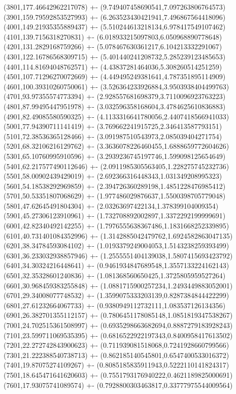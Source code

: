 {(3801,177.46642962217078) +- (9.749407458690541,7.097263806764573)
(3901,159.79592853527993) +- (6.263523430421941,7.496867564418096)
(4001,149.21935355889437) +- (5.510244613218134,6.978417549107462)
(4101,139.7156318270831) +- (6.018933215097803,6.050968890778648)
(4201,131.2829168759266) +- (5.078467630361217,6.104213332291067)
(4301,122.16786568309715) +- (5.401440241208732,5.285239123485653)
(4401,114.81694048762571) +- (4.43837281464036,5.308260514251259)
(4501,107.71296270072669) +- (4.449495249381641,4.787351895114909)
(4601,100.39310260750061) +- (3.526364233926884,3.9503938404499763)
(4701,93.97355574773394) +- (2.928557681698379,3.7110096923763223)
(4801,87.99495447951978) +- (3.032596358168604,3.4784625610836883)
(4901,82.49085580590325) +- (4.1133316641780056,2.4407418566941033)
(5001,77.94390711141419) +- (3.769662241915725,2.346413587793151)
(5101,72.38536365128466) +- (3.091987510543973,2.085039404271754)
(5201,68.32106216129762) +- (3.3636078226460455,1.6888659772604626)
(5301,65.10760995910596) +- (3.2939236745197746,1.599098125654649)
(5401,62.217577490112646) +- (2.0911985305563405,1.228275745232736)
(5501,58.00902439429019) +- (2.692366316448343,1.031349208995323)
(5601,54.18538292969859) +- (2.394726360289198,1.4851228476985412)
(5701,50.53351807068629) +- (1.977486029876637,1.5500398705779048)
(5801,47.62645491804304) +- (2.03263697422134,1.378399104009354)
(5901,45.27306123910961) +- (1.732708892002897,1.3372292199999691)
(6001,42.82340492142255) +- (1.7976555638367486,1.1831668252339895)
(6101,40.731401084352996) +- (1.3142885042479762,1.6924582863047135)
(6201,38.34784593084102) +- (1.0193379249004053,1.5143238259393499)
(6301,36.233032938857946) +- (1.2555551404139038,1.5807415693423792)
(6401,34.30324216448641) +- (0.9461934847689548,1.3557133224162143)
(6501,32.35328601240836) +- (1.081368560650425,1.3725805959527264)
(6601,30.968459383255848) +- (1.0881715900257234,1.2493449883052001)
(6701,29.34008077748532) +- (1.3599075333203139,0.8287384844422299)
(6801,27.61232664067733) +- (0.9380949112732111,1.083537126134356)
(6901,26.382701355112157) +- (0.7806451178085148,1.0851819347538267)
(7001,24.702515361508997) +- (0.6935298663682694,0.8887279183928243)
(7101,23.599711069535395) +- (0.6816522922197343,0.8400958417613502)
(7201,22.272742843900623) +- (0.711939081518068,0.7241928660799566)
(7301,21.222388540738713) +- (0.862185140545801,0.6547400533016372)
(7401,19.87075274109267) +- (0.8085185835911943,0.5222110141824317)
(7501,18.645471641620603) +- (0.7551793176940222,0.4621189825000691)
(7601,17.93075741089574) +- (0.7928800303463817,0.33777975544009564)
}
